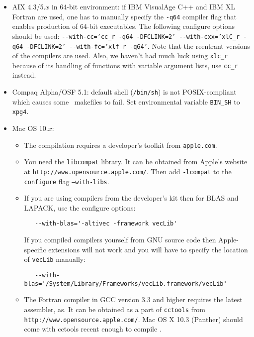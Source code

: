 \documentclass[12pt]{article}
\begin{document}
\begin{itemize}

\item AIX 4.3/5.$x$ in 64-bit environment:
if IBM VisualAge C++ and IBM XL Fortran are used,
one has to manually specify
the {\tt -q64} compiler flag
that enables production of 64-bit executables.
The following configure options should be used:
{\tt -}{\tt -with-cc='cc\_r -q64 -DFCLINK=2' -}{\tt -with-cxx='xlC\_r -q64
-DFCLINK=2' -}{\tt -with-fc='xlf\_r -q64'}. Note that
the reentrant versions of the compilers
are used. Also, we haven't had much luck
using {\tt xlc\_r} because of its
handling of functions with variable argument lists,
use {\tt cc\_r} instead.

\item Compaq Alpha/OSF 5.1: default shell ({\tt /bin/sh})
is not POSIX-compliant which causes some \PSIthree\ makefiles
to fail. Set environmental variable {\tt BIN\_SH} to {\tt xpg4}.

\item Mac OS 10.$x$:

  \begin{itemize}
   \item The compilation requires a developer's toolkit from {\tt apple.com}.

   \item You need the {\tt libcompat} library. It can be obtained from Apple's 
   website at {\tt http://www.opensource.apple.com/}. Then add {\tt -lcompat} to the
   {\tt configure} flag {\tt --with-libs}.

   \item If you are using compilers from the developer's kit then for
   BLAS and LAPACK, use the configure options:
   \begin{verbatim}
   --with-blas='-altivec -framework vecLib'
   \end{verbatim}
   If you compiled compilers yourself from GNU source code then
   Apple-specific extensions will not work and you will have to specify
   the location of {\tt vecLib} manually:
   \begin{verbatim}
   --with-blas='/System/Library/Frameworks/vecLib.framework/vecLib'
   \end{verbatim}

   \item The Fortran compiler in GCC version 3.3 and higher requires the latest
   assembler, as. It can be obtained as a part of {\tt cctools} from 
   {\tt http://www.opensource.apple.com/}.  Mac OS X 10.3 (Panther) should come 
   with cctools recent enough to compile \PSIthree.


\end{itemize}
\end{itemize}
\end{document}

